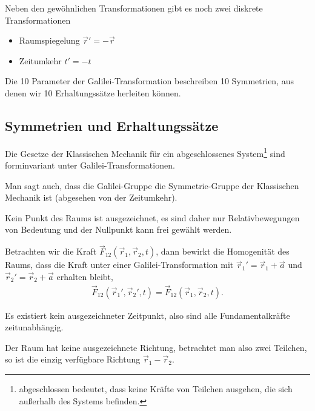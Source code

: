  Neben den gewöhnlichen Transformationen gibt es
noch zwei diskrete Transformationen
\begin{itemize}[label=]
  \item Raumspiegelung $\vec{r}' = -\vec{r}$
  \item Zeitumkehr $t' = -t$
\end{itemize}

Die 10 Parameter der Galilei-Transformation beschreiben 10 Symmetrien, aus
denen wir 10 Erhaltungssätze herleiten können.

\subsection{Symmetrien und Erhaltungssätze}

Die Gesetze der Klassischen Mechanik für ein abgeschlossenes
System\footnote{abgeschlossen bedeutet, dass keine Kräfte von Teilchen
ausgehen, die sich außerhalb des Systems befinden.} sind forminvariant unter
Galilei-Transformationen.

\begin{bemn}
Man sagt auch, dass die Galilei-Gruppe die Symmetrie-Gruppe der Klassischen
Mechanik ist (abgesehen von der Zeitumkehr).\maphere
\end{bemn}

\begin{propn}
Kein Punkt des Raums ist ausgezeichnet, es sind daher nur Relativbewegungen von
Bedeutung und der Nullpunkt kann frei gewählt werden.\fishhere
\end{propn}
Betrachten wir die Kraft $\vec{F}_{12}(\vec{r}_1,\vec{r}_2,t)$, dann
bewirkt die Homogenität des Raums, dass die Kraft unter einer
Galilei-Transformation mit $\vec{r}_1' = \vec{r}_1+\vec{a}$ und $\vec{r}_2' =
\vec{r}_2+\vec{a}$ erhalten bleibt,
\begin{align*}
\vec{F}_{12}(\vec{r}_1',\vec{r}_2',t) =
\vec{F}_{12}(\vec{r}_1,\vec{r}_2,t).
\end{align*}

\begin{propn}
Es existiert kein ausgezeichneter Zeitpunkt, also sind alle Fundamentalkräfte
zeitunabhängig.\fishhere
\end{propn}

\begin{propn}
Der Raum hat keine ausgezeichnete Richtung, betrachtet man also zwei Teilchen,
so ist die einzig verfügbare Richtung $\vec{r}_1-\vec{r}_2$.\fishhere
\end{propn}

